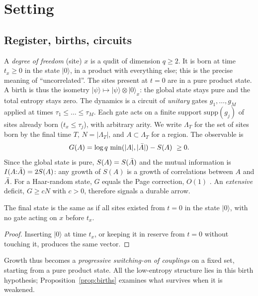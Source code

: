 \section{Setting}\label{sec:setting}

\subsection{Register, births, circuits}

A \emph{degree of freedom} (site) $x$ is a qudit of dimension $q\ge2$. It is born at time $t_x\ge0$ in the state $|0\rangle$, in a product with everything else; this is the precise meaning of ``uncorrelated''. The sites present at $t=0$ are in a pure product state. A birth is thus the isometry $|\psi\rangle\mapsto|\psi\rangle\otimes|0\rangle_x$: the global state stays pure and the total entropy stays zero. The dynamics is a circuit of \emph{unitary} gates $g_1,\dots,g_M$ applied at times $\tau_1\le\dots\le\tau_M$. Each gate acts on a finite support $\mathrm{supp}(g_j)$ of sites already born ($t_x\le\tau_j$), with arbitrary arity. We write $\Lambda_T$ for the set of sites born by the final time $T$, $N=|\Lambda_T|$, and $A\subset\Lambda_T$ for a region. The observable is
\begin{equation}\label{eq:G}
G(A)=\log q\,\min(|A|,|\bar A|)-S(A)\ \ge0 .
\end{equation}
Since the global state is pure, $S(A)=S(\bar A)$ and the mutual information is $I(A{:}\bar A)=2S(A)$: any growth of $S(A)$ is a growth of correlations between $A$ and $\bar A$. For a Haar-random state, $G$ equals the Page correction, $O(1)$ \cite{Page1993}. An \emph{extensive} deficit, $G\ge cN$ with $c>0$, therefore signals a durable arrow.

\begin{lemma}[birth = idle qudit]\label{lem:idle}
The final state is the same as if all sites existed from $t=0$ in the state $|0\rangle$, with no gate acting on $x$ before $t_x$.
\end{lemma}
\begin{proof}
Inserting $|0\rangle$ at time $t_x$, or keeping it in reserve from $t=0$ without touching it, produces the same vector.
\end{proof}

Growth thus becomes a \emph{progressive switching-on of couplings} on a fixed set, starting from a pure product state. All the low-entropy structure lies in this birth hypothesis; Proposition~\ref{prop:births} examines what survives when it is weakened.

